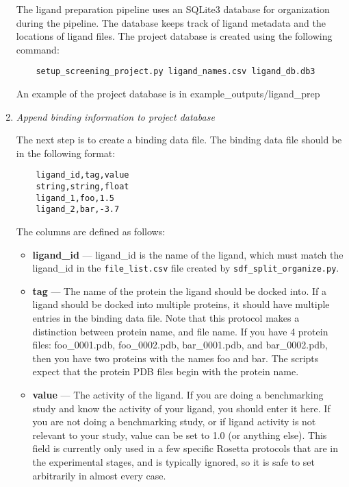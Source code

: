 \begin{enumerate}
	The ligand preparation pipeline uses an SQLite3 database for organization during the pipeline.
	The database keeps track of ligand metadata and the locations of ligand files.
	The project database is created using the following command:

	\begin{verbatim}
	setup_screening_project.py ligand_names.csv ligand_db.db3
	\end{verbatim}

  	An example of the project database is in example\_outputs/ligand\_prep
\item
	\emph{Append binding information to project database}

	The next step is to create a binding data file. The binding data file should be in the following format:

	\begin{verbatim}
	ligand_id,tag,value
	string,string,float
	ligand_1,foo,1.5
	ligand_2,bar,-3.7
	\end{verbatim}

	The columns are defined as follows:

	\begin{itemize}
	\itemsep1pt\parskip0pt
	\item
		\textbf{ligand\_id} --- ligand\_id is the name of the ligand, which must match the ligand\_id in the \texttt{file\_list.csv} file created by \texttt{sdf\_split\_organize.py}.
	\item
 		\textbf{tag} --- The name of the protein the ligand should be docked into.
		If a ligand should be docked into multiple proteins, it should have multiple entries in the binding data file.
		Note that this protocol makes a distinction between protein name, and file name.
		If you have 4 protein files: foo\_0001.pdb, foo\_0002.pdb, bar\_0001.pdb, and bar\_0002.pdb, then you have two proteins with the names foo and bar.
		The scripts expect that the protein \ac{PDB} files begin with the protein name.
	\item
		\textbf{value} --- The activity of the ligand. If you are doing a benchmarking study and know the activity of your ligand, you should enter it here.
		If you are not doing a benchmarking study, or if ligand activity is not relevant to your study, value can be set to 1.0 (or anything else). 
		This field is currently only used in a few specific Rosetta protocols that are in the experimental stages, and is  typically ignored, so it is safe to set arbitrarily in almost every  case.
	\end{itemize}


\end{enumerate}
